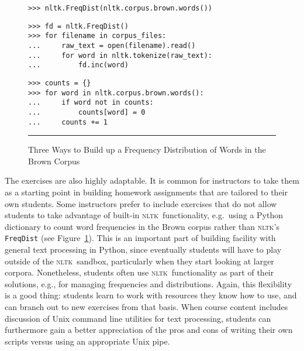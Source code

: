 \documentclass[11pt]{article}
\newcommand{\NLTK}{\textsc{nltk}}
\newcommand{\code}[1]{\texttt{\small #1}}
\begin{document}



\begin{figure}
{\footnotesize
\begin{verbatim}
>>> nltk.FreqDist(nltk.corpus.brown.words())
\end{verbatim}
\medskip

\begin{verbatim}
>>> fd = nltk.FreqDist()
>>> for filename in corpus_files:
...     raw_text = open(filename).read()
...     for word in nltk.tokenize(raw_text):
...         fd.inc(word)
\end{verbatim}
\medskip

\begin{verbatim}
>>> counts = {}
>>> for word in nltk.corpus.brown.words():
...     if word not in counts:
...         counts[word] = 0
...     counts += 1
\end{verbatim}
}
\caption{Three Ways to Build up a Frequency Distribution of Words in the Brown Corpus}
\label{fig:freqdist}
\vspace*{1ex}
\hrule
\end{figure}

The exercises are also highly adaptable. It is common for instructors
to take them as a starting point in building homework assignments that
are tailored to their own students.  Some instructors prefer to
include exercises that do not allow students to take advantage of
built-in \NLTK\ functionality, e.g.\  using a Python dictionary to
count word frequencies in the Brown corpus rather than \NLTK 's
\code{FreqDist} (see Figure~\ref{fig:freqdist}).  This is an important
part of building facility with general text processing in Python,
since eventually students will have to play outside of the \NLTK\
sandbox, particularly when they start looking at larger
corpora. Nonetheless, students often use \NLTK\ functionality as part
of their solutions, e.g., for managing frequencies and
distributions. Again, this flexibility is a good thing: students learn
to work with resources they know how to use, and can branch out to new
exercises from that basis. When course content includes discussion of
Unix command line utilities for text processing, students can
furthermore gain a better appreciation of the pros and cons of writing
their own scripts versus using an appropriate Unix pipe.
\end{document}
